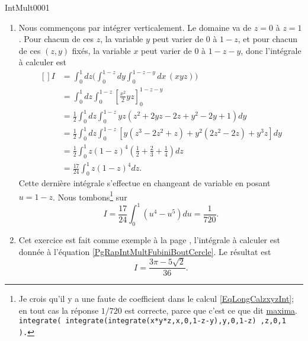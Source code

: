 \begin{corrige}{IntMult0001}
\begin{enumerate}
\item
Nous commençons par intégrer verticalement. Le domaine va de $z=0$ à $z=1$. Pour chacun de ces $z$, la variable $y$ peut varier de $0$ à $1-z$, et pour chacun de ces $(z,y)$ fixés, la variable $x$ peut varier de $0$ à $1-z-y$, donc l'intégrale à calculer est
\begin{equation}		\label{EqLongCalzxyzInt}
	\begin{aligned}[]
		I	&=\int_0^1dz\big( \int_0^{1-z}dy\int_0^{1-z-y}dx\, (xyz) \big)\\
			&=\int_0^1dz\int_0^{1-z}\left[ \frac{ x^2 }{ 2 }yz \right]_0^{1-z-y}\\
			&=\frac{ 1 }{2}\int_0^1dz\int_{0}^{1-z}yz(z^2+2yz-2z+y^2-2y+1)dy\\
			&=\frac{ 1 }{2}\int_0^1dz\int_0^{1-z}[y(z^3-2z^2+z)+y^2(2z^2-2z)+y^3z]dy\\
			&=\frac{ 1 }{2}\int_0^1z(1-z)^4\left( \frac{ 1 }{2}+\frac{ 2 }{ 3 }+\frac{1}{ 4 } \right)dz\\
			&=\frac{ 17 }{ 24 }\int_0^1z(1-z)^4dz.
	\end{aligned}
\end{equation}
Cette dernière intégrale s'effectue en changeant de variable en posant $u=1-z$. Nous tombons\footnote{Je crois qu'il y a une faute de coefficient dans le calcul \eqref{EqLongCalzxyzInt}; en tout cas la réponse $1/720$ est correcte, parce que c'est ce que dit \href{http://fr.wikipedia.org/wiki/Maxima}{maxima}.\\
\texttt{integrate( integrate(integrate(x*y*z,x,0,1-z-y),y,0,1-z) ,z,0,1 ).}} sur
\begin{equation}
	I=\frac{ 17 }{ 24 }\int_0^1(u^4-u^5)du=\frac{1}{ 720 }.
\end{equation}

\item
Cet exercice est fait comme exemple à la page \pageref{PgRapIntMultFubiniBoutCercle}, l'intégrale à calculer est donnée à l'équation \eqref{PgRapIntMultFubiniBoutCercle}. Le résultat est
\begin{equation}
	I=\frac{ 3\pi-5\sqrt{2} }{ 36 }.
\end{equation}

\end{enumerate}

\end{corrige}
